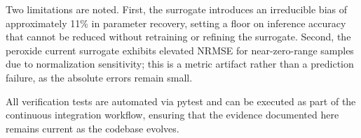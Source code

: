\documentclass[11pt,a4paper]{article}
\begin{document}
Two limitations are noted. First, the surrogate introduces an irreducible
bias of approximately 11\% in parameter recovery, setting a floor on
inference accuracy that cannot be reduced without retraining or refining
the surrogate. Second, the peroxide current surrogate exhibits elevated
NRMSE for near-zero-range samples due to normalization sensitivity; this
is a metric artifact rather than a prediction failure, as the absolute
errors remain small.

All verification tests are automated via pytest and can be executed as
part of the continuous integration workflow, ensuring that the evidence
documented here remains current as the codebase evolves.




\end{document}
